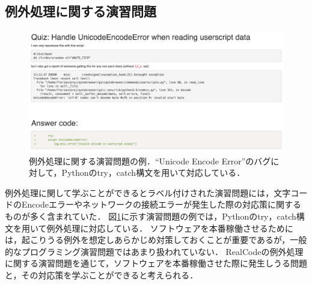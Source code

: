 \subsection{例外処理に関する演習問題}


\begin{figure}[t]
  \centering
  \includegraphics[width=1.0\columnwidth]{20190107-lab-study-exception-exercise2.png}
  \caption{例外処理に関する演習問題の例．``Unicode Encode Error''のバグに対して，Pythonのtry，catch構文を用いて対応している．}
  \label{fig:lab-study-eg-exception}
\end{figure}


例外処理に関して学ぶことができるとラベル付けされた演習問題には，文字コードのEncodeエラーやネットワークの接続エラーが発生した際の対応策に関するものが多く含まれていた．
図\ref{fig:lab-study-eg-exception}に示す演習問題の例では，Pythonのtry，catch構文を用いて例外処理に対応している．
ソフトウェアを本番稼働させるためには，起こりうる例外を想定しあらかじめ対策しておくことが重要であるが，一般的なプログラミング演習問題ではあまり扱われていない．
RealCodeの例外処理に関する演習問題を通じて，ソフトウェアを本番稼働させた際に発生しうる問題と，その対応策を学ぶことができると考えられる．


